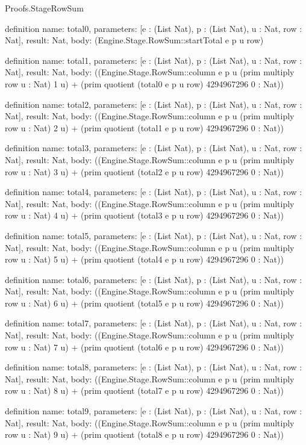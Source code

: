 \begin{lexlean}{Proofs.StageRowSum}
\begin{semanticmodule}
definition{
  name: total0,
  parameters: [e : (List Nat), p : (List Nat), u : Nat, row : Nat],
  result: Nat,
  body: (Engine.Stage.RowSum::startTotal e p u row)
}

definition{
  name: total1,
  parameters: [e : (List Nat), p : (List Nat), u : Nat, row : Nat],
  result: Nat,
  body: ((Engine.Stage.RowSum::column e p u (prim multiply row u : Nat) 1 u) + (prim quotient (total0 e p u row) 4294967296 0 : Nat))
}

definition{
  name: total2,
  parameters: [e : (List Nat), p : (List Nat), u : Nat, row : Nat],
  result: Nat,
  body: ((Engine.Stage.RowSum::column e p u (prim multiply row u : Nat) 2 u) + (prim quotient (total1 e p u row) 4294967296 0 : Nat))
}

definition{
  name: total3,
  parameters: [e : (List Nat), p : (List Nat), u : Nat, row : Nat],
  result: Nat,
  body: ((Engine.Stage.RowSum::column e p u (prim multiply row u : Nat) 3 u) + (prim quotient (total2 e p u row) 4294967296 0 : Nat))
}

definition{
  name: total4,
  parameters: [e : (List Nat), p : (List Nat), u : Nat, row : Nat],
  result: Nat,
  body: ((Engine.Stage.RowSum::column e p u (prim multiply row u : Nat) 4 u) + (prim quotient (total3 e p u row) 4294967296 0 : Nat))
}

definition{
  name: total5,
  parameters: [e : (List Nat), p : (List Nat), u : Nat, row : Nat],
  result: Nat,
  body: ((Engine.Stage.RowSum::column e p u (prim multiply row u : Nat) 5 u) + (prim quotient (total4 e p u row) 4294967296 0 : Nat))
}

definition{
  name: total6,
  parameters: [e : (List Nat), p : (List Nat), u : Nat, row : Nat],
  result: Nat,
  body: ((Engine.Stage.RowSum::column e p u (prim multiply row u : Nat) 6 u) + (prim quotient (total5 e p u row) 4294967296 0 : Nat))
}

definition{
  name: total7,
  parameters: [e : (List Nat), p : (List Nat), u : Nat, row : Nat],
  result: Nat,
  body: ((Engine.Stage.RowSum::column e p u (prim multiply row u : Nat) 7 u) + (prim quotient (total6 e p u row) 4294967296 0 : Nat))
}

definition{
  name: total8,
  parameters: [e : (List Nat), p : (List Nat), u : Nat, row : Nat],
  result: Nat,
  body: ((Engine.Stage.RowSum::column e p u (prim multiply row u : Nat) 8 u) + (prim quotient (total7 e p u row) 4294967296 0 : Nat))
}

definition{
  name: total9,
  parameters: [e : (List Nat), p : (List Nat), u : Nat, row : Nat],
  result: Nat,
  body: ((Engine.Stage.RowSum::column e p u (prim multiply row u : Nat) 9 u) + (prim quotient (total8 e p u row) 4294967296 0 : Nat))
}


\end{semanticmodule}
\end{lexlean}
